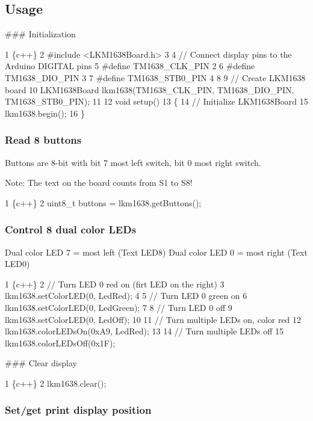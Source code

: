 \subsection*{Usage}

\#\#\# Initialization 
\begin{DoxyCode}
1 \{c++\}
2 #include <LKM1638Board.h>
3 
4 // Connect display pins to the Arduino DIGITAL pins
5 #define TM1638\_CLK\_PIN   2
6 #define TM1638\_DIO\_PIN   3
7 #define TM1638\_STB0\_PIN  4
8 
9 // Create LKM1638 board
10 LKM1638Board lkm1638(TM1638\_CLK\_PIN, TM1638\_DIO\_PIN, TM1638\_STB0\_PIN);
11 
12 void setup()
13 \{
14     // Initialize LKM1638Board
15     lkm1638.begin();
16 \}
\end{DoxyCode}


\subsubsection*{Read 8 buttons}

Buttons are 8-\/bit with bit 7 most left switch, bit 0 most right switch.

Note\+: The text on the board counts from S1 to S8!


\begin{DoxyCode}
1 \{c++\}
2 uint8\_t buttons = lkm1638.getButtons();
\end{DoxyCode}


\subsubsection*{Control 8 dual color L\+ED\textquotesingle{}s}

Dual color L\+ED 7 = most left (Text L\+E\+D8) Dual color L\+ED 0 = most right (Text L\+E\+D0)


\begin{DoxyCode}
1 \{c++\}
2 // Turn LED 0 red on (firt LED on the right)
3 lkm1638.setColorLED(0, LedRed);  
4 
5 // Turn LED 0 green on
6 lkm1638.setColorLED(0, LedGreen);
7 
8 // Turn LED 0 off
9 lkm1638.setColorLED(0, LedOff);
10 
11 // Turn multiple LEDs on, color red
12 lkm1638.colorLEDsOn(0xA9, LedRed);
13 
14 // Turn multiple LEDs off
15 lkm1638.colorLEDsOff(0x1F);
\end{DoxyCode}


\#\#\# Clear display 
\begin{DoxyCode}
1 \{c++\}
2 lkm1638.clear();
\end{DoxyCode}


\subsubsection*{Set/get print display position}

